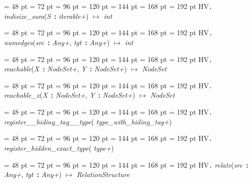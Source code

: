 {{{{\par \noindent  \leftskip = 48 pt  \leftmargini = 72 pt  \leftmarginii = 96 pt  \leftmarginiii = 120 pt  \leftmarginiv = 144 pt  \leftmarginv = 168 pt  \leftmarginvi = 192 pt HV{\large {\tt .\/} {\em indisize{\_}sum\/}}({\em S\/}~{\bf :}  {\em iterable+\/}) \(\mapsto \)  {\em int\/}\par}
{\par \noindent  \leftskip = 48 pt  \leftmargini = 72 pt  \leftmarginii = 96 pt  \leftmarginiii = 120 pt  \leftmarginiv = 144 pt  \leftmarginv = 168 pt  \leftmarginvi = 192 pt HV{\large {\tt .\/} {\em numedges\/}}({\em src\/}~{\bf :}  {\em Any+\/}, {\em tgt\/}~{\bf :}  {\em Any+\/}) \(\mapsto \)  {\em int\/}\par}
{\par \noindent  \leftskip = 48 pt  \leftmargini = 72 pt  \leftmarginii = 96 pt  \leftmarginiii = 120 pt  \leftmarginiv = 144 pt  \leftmarginv = 168 pt  \leftmarginvi = 192 pt HV{\large {\tt .\/} {\em reachable\/}}({\em X\/}~{\bf :}  {\em NodeSet+\/}, {\em Y\/}~{\bf :}  {\em NodeSet+\/}) \(\mapsto \)  {\em NodeSet\/}\par}
{\par \noindent  \leftskip = 48 pt  \leftmargini = 72 pt  \leftmarginii = 96 pt  \leftmarginiii = 120 pt  \leftmarginiv = 144 pt  \leftmarginv = 168 pt  \leftmarginvi = 192 pt HV{\large {\tt .\/} {\em reachable{\_}x\/}}({\em X\/}~{\bf :}  {\em NodeSet+\/}, {\em Y\/}~{\bf :}  {\em NodeSet+\/}) \(\mapsto \)  {\em NodeSet\/}\par}
{\par \noindent  \leftskip = 48 pt  \leftmargini = 72 pt  \leftmarginii = 96 pt  \leftmarginiii = 120 pt  \leftmarginiv = 144 pt  \leftmarginv = 168 pt  \leftmarginvi = 192 pt HV{\large {\tt .\/} {\em register{\_}{\_}hiding{\_}tag{\_}{\_}type\/}}( {\em type{\_}with{\_}hiding{\_}tag+\/})\par}
{\par \noindent  \leftskip = 48 pt  \leftmargini = 72 pt  \leftmarginii = 96 pt  \leftmarginiii = 120 pt  \leftmarginiv = 144 pt  \leftmarginv = 168 pt  \leftmarginvi = 192 pt HV{\large {\tt .\/} {\em register{\_}hidden{\_}exact{\_}type\/}}( {\em type+\/})\par}
{\par \noindent  \leftskip = 48 pt  \leftmargini = 72 pt  \leftmarginii = 96 pt  \leftmarginiii = 120 pt  \leftmarginiv = 144 pt  \leftmarginv = 168 pt  \leftmarginvi = 192 pt HV{\large {\tt .\/} {\em relate\/}}({\em src\/}~{\bf :}  {\em Any+\/}, {\em tgt\/}~{\bf :}  {\em Any+\/}) \(\mapsto \)  {\em RelationStructure\/}\par}
}}}
